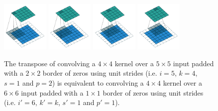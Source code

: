 \documentclass{article}
\begin{document}
\begin{figure}[t]
    \centering
    \includegraphics[width=0.2\textwidth]
        {pdf/arbitrary_padding_no_strides_transposed_00.pdf}
    \includegraphics[width=0.2\textwidth]
        {pdf/arbitrary_padding_no_strides_transposed_01.pdf}
    \includegraphics[width=0.2\textwidth]
        {pdf/arbitrary_padding_no_strides_transposed_02.pdf}
    \includegraphics[width=0.2\textwidth]
        {pdf/arbitrary_padding_no_strides_transposed_03.pdf}
    \caption{\label{fig:arbitrary_padding_no_strides_transposed} The transpose
        of convolving a $4 \times 4$ kernel over a $5 \times 5$ input padded
        with a $2 \times 2$ border of zeros using unit strides (i.e. $i = 5$,
        $k = 4$, $s = 1$ and $p = 2$) is equivalent to convolving a $4 \times 4$
        kernel over a $6 \times 6$ input padded with a $1 \times 1$ border of
        zeros using unit strides (i.e. $i' = 6$, $k' = k$, $s' = 1$ and $p' =
        1$).}
\end{figure}
\end{document}
